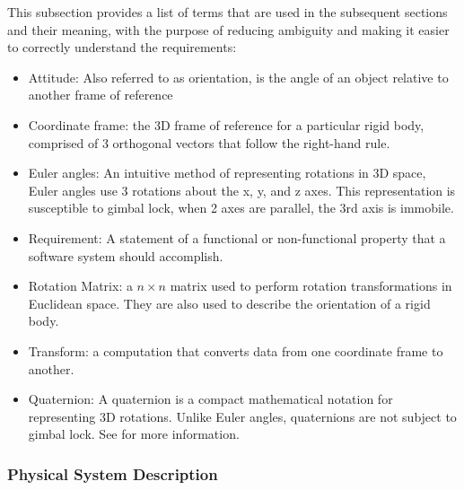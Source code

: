 \documentclass[12pt]{article}
\begin{document}
This subsection provides a list of terms that are used in the subsequent sections and their meaning,
with the purpose of reducing ambiguity and making it easier to correctly understand the
requirements:

\begin{itemize}

\item Attitude: Also referred to as orientation, is the angle of an object relative to another frame
of reference
\item Coordinate frame: the 3D frame of reference for a particular rigid body, comprised of 3
orthogonal vectors that follow the right-hand rule.
\item Euler angles: An intuitive method of representing rotations in 3D space, Euler angles use 3
rotations about the x, y, and z axes. This representation is susceptible to gimbal lock, when 2 axes
are parallel, the 3rd axis is immobile.
\item Requirement: A statement of a functional or non-functional property that a software system
should accomplish.
\item Rotation Matrix: a $n \times n$ matrix used to perform rotation transformations in Euclidean
space. They are also used to describe the orientation of a rigid body.
\item Transform: a computation that converts data from one coordinate frame to another.
\item Quaternion: A quaternion is a compact mathematical notation for representing 3D rotations.
Unlike Euler angles, quaternions are not subject to gimbal lock. See \cite{quat} for more
information.
\end{itemize}

\subsubsection{Physical System Description} \label{sec_phySystDescrip}

\end{document}

